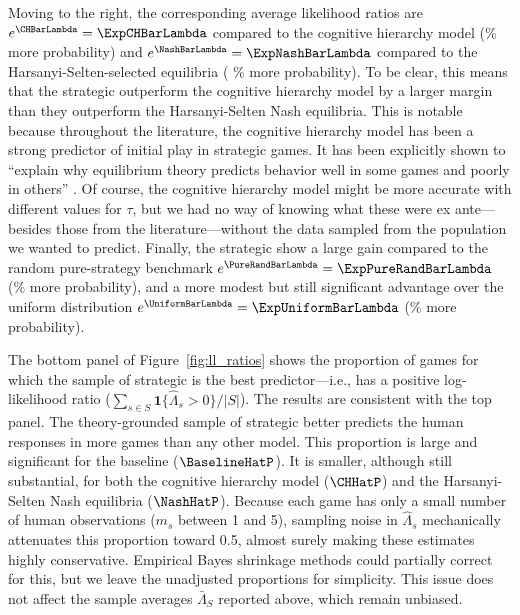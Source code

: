 Moving to the right, the corresponding average likelihood ratios are $e^{\CHBarLambda} = \ExpCHBarLambda$ compared to the cognitive hierarchy model (\PctCHBarLambda\% more probability) and $e^{\NashBarLambda} = \ExpNashBarLambda$ compared to the Harsanyi-Selten-selected equilibria ( \PctNashBarLambda\% more probability).
To be clear, this means that the strategic  outperform the cognitive hierarchy model by a larger margin than they outperform the Harsanyi-Selten Nash equilibria.
This is notable because throughout the literature, the cognitive hierarchy model has been a strong predictor of initial play in strategic games.
It has been explicitly shown to ``explain why equilibrium theory predicts behavior well in some games and poorly in others'' \citep{Camerer2004Cognitive}.
Of course, the cognitive hierarchy model might be more accurate with different values for $\tau$, but we had no way of knowing what these were ex ante---besides those from the literature---without the data sampled from the population we wanted to predict.
Finally, the strategic  show a large gain compared to the random pure-strategy benchmark $e^{\PureRandBarLambda} = \ExpPureRandBarLambda$ (\PctPureRandBarLambda\% more probability), and a more modest but still significant advantage over the uniform distribution $e^{\UniformBarLambda} = \ExpUniformBarLambda$ (\PctUniformBarLambda\% more probability).

The bottom panel of Figure~\ref{fig:ll_ratios} shows the proportion of games for which the sample of strategic  is the best predictor---i.e., has a positive log-likelihood ratio ($\sum_{s \in S} \mathbf 1\{\hat \Lambda_s > 0\} / |S|$).
The results are consistent with the top panel.
The theory-grounded sample of strategic  better predicts the human responses in more games than any other model.
This proportion is large and significant for the baseline ($\BaselineHatP$).
It is smaller, although still substantial, for both the cognitive hierarchy model ($\CHHatP$) and the Harsanyi-Selten Nash equilibria ($\NashHatP$).
Because each game has only a small number of human observations ($m_s$ between 1 and 5), sampling noise in $\hat\Lambda_s$ mechanically attenuates this proportion toward 0.5, almost surely making these estimates highly conservative.
Empirical Bayes shrinkage methods \citep[see][]{walters2024empirical} could partially correct for this, but we leave the unadjusted proportions for simplicity.
This issue does not affect the sample averages $\bar\Lambda_S$ reported above, which remain unbiased.

